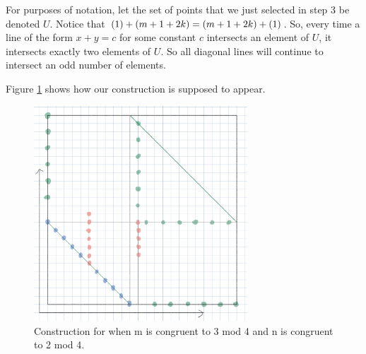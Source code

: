 \documentclass[10pt]{../usamts}
\begin{document}
\begin{solution}
\begin{enumerate}
    For purposes of notation, let the set of points that we just selected in step 3 be denoted $U$. Notice that $\left( 1 \right)+\left( m+1+2k \right) = \left( m+1+2k \right)+\left( 1 \right)$. So, every time a line of the form $x+y=c$ for some constant $c$ intersects an element of $U$, it intersects exactly two elements of $U$. So all diagonal lines will continue to intersect an odd number of elements.
\end{enumerate}

Figure \ref{fig:twothreeconstruct} shows how our construction is supposed to appear.
\begin{figure}[htbp]
    \includegraphics[width=8cm]{round2/p5construct/construct_11_14.png}
    \caption{Construction for when m is congruent to 3 mod 4 and n is congruent to 2 mod 4.}
    \label{fig:twothreeconstruct}
\end{figure}

\end{solution}
\end{document}
